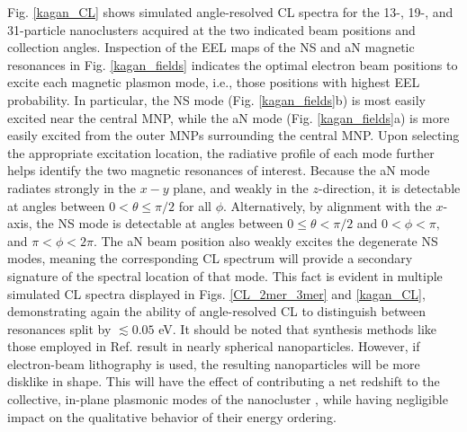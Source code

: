\documentclass[journal=apchd5,manuscript=article]{achemso}
\begin{document}
Fig. \ref{kagan_CL} shows simulated angle-resolved CL spectra for the 13-, 19-, and 31-particle nanoclusters acquired at the two indicated beam positions and collection angles. Inspection of the EEL maps of the NS and aN magnetic resonances in Fig. \ref{kagan_fields} indicates the optimal electron beam positions to excite each magnetic plasmon mode, i.e., those positions with highest EEL probability. In particular, the NS mode (Fig. \ref{kagan_fields}b) is most easily excited near the central MNP, while the aN mode (Fig. \ref{kagan_fields}a) is more easily excited from the outer MNPs surrounding the central MNP. Upon selecting the appropriate excitation location, the radiative profile of each mode further helps identify the two magnetic resonances of interest. Because the aN mode radiates strongly in the $x-y$ plane, and weakly in the $z$-direction, it is detectable at angles between $0 < \theta \leq \pi/2$ for all $\phi$. Alternatively, by alignment with the $x$-axis, the NS mode is detectable at angles between $0 \leq \theta < \pi/2$ and $0<\phi<\pi,$ and $\pi<\phi<2\pi.$ The aN beam position also weakly excites the degenerate NS modes, meaning the corresponding CL spectrum will provide a secondary signature of the spectral location of that mode. This fact is evident in multiple simulated CL spectra displayed in Figs. \ref{CL_2mer_3mer} and \ref{kagan_CL}, demonstrating again the ability of angle-resolved CL to distinguish between resonances split by $\lesssim0.05$ eV. It should be noted that synthesis methods like those employed in Ref. \cite{Engheta2017} result in nearly spherical nanoparticles. However, if electron-beam lithography is used, the resulting nanoparticles will be more disklike in shape. This will have the effect of contributing a net redshift to the collective, in-plane plasmonic modes of the nanocluster \cite{Noguez}, while having negligible impact on the qualitative behavior of their energy ordering.
\end{document}
